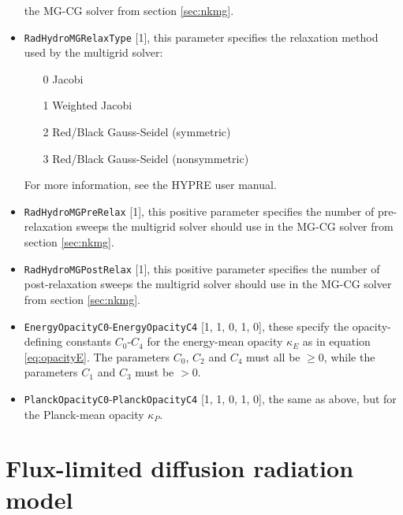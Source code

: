 \documentclass[letterpaper,10pt]{article}
\renewcommand{\(}{\left(}
\renewcommand{\)}{\right)}
\begin{document}
\begin{itemize}
  the MG-CG solver from section \ref{sec:nkmg}.
\item {\tt RadHydroMGRelaxType} [1], this parameter specifies the
  relaxation method used by the multigrid solver:
  \begin{itemize}
  \item[0] Jacobi
  \item[1] Weighted Jacobi
  \item[2] Red/Black Gauss-Seidel (symmetric)
  \item[3] Red/Black Gauss-Seidel (nonsymmetric)
  \end{itemize}
  For more information, see the HYPRE user manual.
\item {\tt RadHydroMGPreRelax} [1], this positive parameter
  specifies the number of pre-relaxation sweeps the multigrid solver
  should use in the MG-CG solver from section \ref{sec:nkmg}.
\item {\tt RadHydroMGPostRelax} [1], this positive parameter
  specifies the number of post-relaxation sweeps the multigrid solver
  should use in the MG-CG solver from section \ref{sec:nkmg}.
\item {\tt EnergyOpacityC0}-{\tt EnergyOpacityC4} [1, 1, 0, 1, 0],
  these specify the opacity-defining constants $C_0$-$C_4$ for the
  energy-mean opacity $\kappa_E$ as in equation \eqref{eq:opacityE}.
  The parameters $C_0$, $C_2$ and $C_4$ must all be $\ge 0$, while the
  parameters $C_1$ and $C_3$ must be $> 0$.
\item {\tt PlanckOpacityC0}-{\tt PlanckOpacityC4} [1, 1, 0, 1, 0], the
  same as above, but for the Planck-mean opacity $\kappa_P$.
\end{itemize}





\section{Flux-limited diffusion radiation model}
\label{sec:rad_model}
\end{document}
